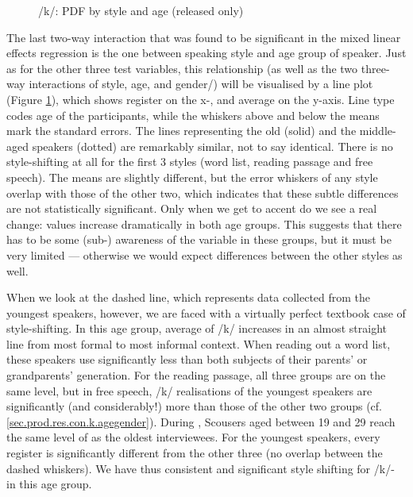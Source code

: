 \begin{figure}[h]
	\centering
		\resizebox{0.5\linewidth}{!}{} 
	\caption{/k/: PDF by style and age (released only)}
	\label{fig.line.k.tot}
\end{figure}

The last two-way interaction that was found to be significant in the mixed linear effects regression is the one between speaking style and age group of speaker.
Just as for the other three test variables, this relationship (as well as the two three-way interactions of style, age, and gender/) will be visualised by a line plot (Figure \ref{fig.line.k.tot}), which shows register on the x-, and average  on the y-axis.
Line type codes age of the participants, while the whiskers above and below the means mark the standard errors.
The lines representing the old (solid) and the middle-aged speakers (dotted) are remarkably similar, not to say identical.
There is no style-shifting at all for the first 3 styles (word list, reading passage and free speech).
The means are slightly different, but the error whiskers of any style overlap with those of the other two, which indicates that these subtle differences are not statistically significant.
Only when we get to accent  do we see a real change:  values increase dramatically in both age groups.
This suggests that there has to be some (sub-) awareness of the variable in these groups, but it must be very limited --- otherwise we would expect differences between the other styles as well.

When we look at the dashed line, which represents data collected from the youngest speakers, however, we are faced with a virtually perfect textbook case of  style-shifting.
In this age group, average  of /k/ increases in an almost straight line from most formal to most informal context.
When reading out a word list, these speakers use significantly less  than both subjects of their parents' or grandparents' generation.
For the reading passage, all three groups are on the same level, but in free speech, /k/ realisations of the youngest speakers are significantly (and considerably!) more  than those of the other two groups (cf. \ref{sec.prod.res.con.k.agegender}).
During , Scousers aged between 19 and 29 reach the same level of  as the oldest interviewees.
For the youngest speakers, every register is significantly different from the other three (no overlap between the dashed whiskers).
We have thus consistent and significant style shifting for /k/- in this age group.

